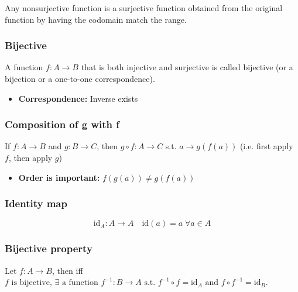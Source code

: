     \begin{warning}
        Any nonsurjective function is a surjective function obtained from the original function by having the codomain match the range.
    \end{warning}

    \subsubsection{Bijective}
    \begin{definition}
        A function \( f: A \to B \) that is both injective and surjective is called bijective (or a bijection or a one-to-one correspondence).
        \begin{itemize}
            \item \textbf{Correspondence:} Inverse exists
        \end{itemize}
    \end{definition}

    \subsubsection{Composition of g with f}
    \begin{definition}
        If \( f: A \to B \) and \( g: B \to C \), then \( g \circ f: A \to C \) s.t. $a \rightarrow g(f(a))$ (i.e. first apply $f$, then apply $g$)
        
        \begin{itemize}
            \item \textbf{Order is important:} $ f(g(a)) \neq g(f(a)) $
        \end{itemize}
    \end{definition}

    \subsubsection{Identity map}
    \begin{definition}
        \[
        \text{id}_A: A \to A \quad \text{id}(a) = a \; \forall a \in A
        \]
    \end{definition}

    \subsubsection{Bijective property}
    \begin{definition}
        Let \( f: A \to B \), then iff \( f \text{ is bijective, } \exists \text{ a function } f^{-1}: B \to A \text{ s.t. } f^{-1} \circ f = \text{id}_A \text{ and } f \circ f^{-1} = \text{id}_B \).
    \end{definition}

